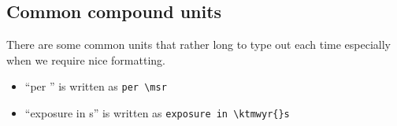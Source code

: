 \subsection{Common compound units}

There are some common units that rather long to type out each time
especially when we require nice formatting.

\begin{itemize}
\item ``per \msr'' is written as \verb|per \msr|
\item ``exposure in \ktmwyr{}s'' is written as \verb|exposure in \ktmwyr{}s|
\end{itemize}

